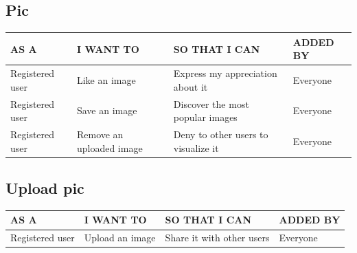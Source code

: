 \documentclass[11pt, a4paper]{article}
\begin{document}
\subsection{Pic}
\begin{table}[H]
    \centering
    \begin{tabular}{|p{4.5cm}|p{4cm}|p{5cm}|p{3cm}|}
    \hline
    \rowcolor[HTML]{EFEFEF} 
    AS A            & I WANT TO                & SO THAT I CAN                       & ADDED BY \\ \hline
    Registered user & Like an image            & Express my appreciation about it    & Everyone \\ \hline
    Registered user & Save an image            & Discover the most popular images    & Everyone \\ \hline
    Registered user & Remove an uploaded image & Deny to other users to visualize it & Everyone \\ \hline    
    \end{tabular}
\end{table}
\begin{figure}[H]
    \centering
\end{figure}

\subsection{Upload pic}
\begin{table}[H]
    \centering
    \begin{tabular}{|p{4.5cm}|p{4cm}|p{5cm}|p{3cm}|}
    \hline
    \rowcolor[HTML]{EFEFEF} 
    AS A            & I WANT TO       & SO THAT I CAN             & ADDED BY \\ \hline
    Registered user & Upload an image & Share it with other users & Everyone \\ \hline    
    \end{tabular}
\end{table}
\begin{figure}[H]
    \centering
\end{figure}
\end{document}
